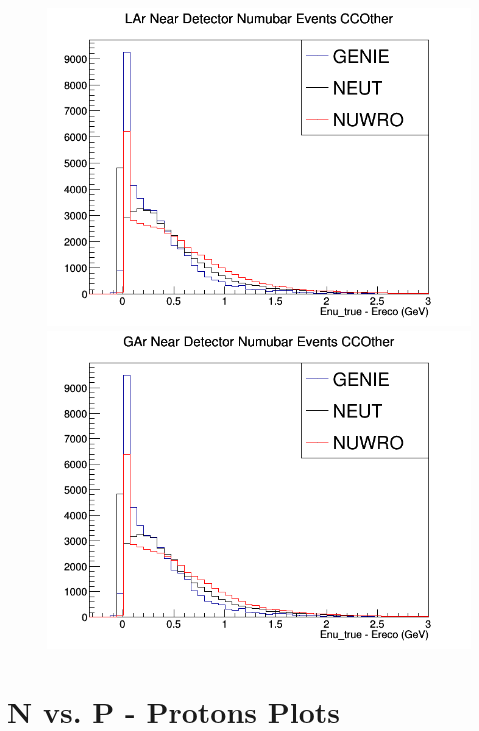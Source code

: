 \documentclass[12pt]{article}
\begin{document}
\begin{figure}[h]
\endminipage
{}
\includegraphics[width=\linewidth]{Ereco_Etrue/numubar_LAr_CCOther.png}
\endminipage
{}
\includegraphics[width=\linewidth]{Ereco_Etrue/numubar_GAr_CCOther.png}
\endminipage
\newline
\end{figure}
\clearpage
\newpage

\section{N vs. P - Protons Plots}
\end{document}
